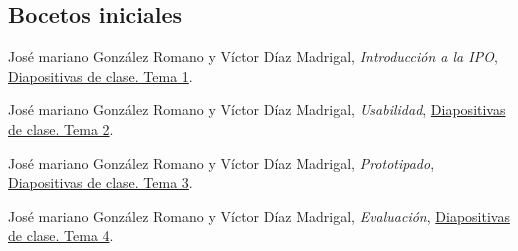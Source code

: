 \documentclass[a4paper,11pt]{article}
\begin{document}
\subsection{Bocetos iniciales}\label{bocetos}



\begin{thebibliography}{99}
  José mariano González Romano y Víctor Díaz Madrigal,
  \textit{Introducción a la IPO},
  \href{https://s3-eu-central-1.amazonaws.com/learn-eu-central-1-prod-fleet01-xythos/5ac734ed505df/1497177?response-content-disposition=inline%3B%20filename%2A%3DUTF-8%27%27IPO-2018-19-01-Introducci%25C3%25B3n%2520a%2520la%2520IPO.pdf&response-content-type=application%2Fpdf&X-Amz-Algorithm=AWS4-HMAC-SHA256&X-Amz-Date=20181009T201303Z&X-Amz-SignedHeaders=host&X-Amz-Expires=21600&X-Amz-Credential=AKIAIZ3QX2YUHH4EOO3A%2F20181009%2Feu-central-1%2Fs3%2Faws4_request&X-Amz-Signature=91e59768c9f86b77180953691bdcae19f7300073d4ad74d0949de1515d0b6f55}{Diapositivas de clase. Tema 1}.

    José mariano González Romano y Víctor Díaz Madrigal,
    \textit{Usabilidad},
    \href{https://s3-eu-central-1.amazonaws.com/learn-eu-central-1-prod-fleet01-xythos/5ac734ed505df/1548262?response-content-disposition=inline%3B%20filename%2A%3DUTF-8%27%27IPO-2018-19-02-Usabilidad.pdf&response-content-type=application%2Fpdf&X-Amz-Algorithm=AWS4-HMAC-SHA256&X-Amz-Date=20181108T092002Z&X-Amz-SignedHeaders=host&X-Amz-Expires=21600&X-Amz-Credential=AKIAIZ3QX2YUHH4EOO3A%2F20181108%2Feu-central-1%2Fs3%2Faws4_request&X-Amz-Signature=b6f88f86fcc8fc9e65cb7762b151621c9d17779d12ea366fa9e6cf74db65f16f}{Diapositivas de clase. Tema 2}.

  José mariano González Romano y Víctor Díaz Madrigal,
  \textit{Prototipado},
  \href{https://s3-eu-central-1.amazonaws.com/learn-eu-central-1-prod-fleet01-xythos/5ac734ed505df/1717656?response-content-disposition=inline%3B%20filename%2A%3DUTF-8%27%27IPO-2018-19-03-Prototipado.pdf&response-content-type=application%2Fpdf&X-Amz-Algorithm=AWS4-HMAC-SHA256&X-Amz-Date=20181108T092046Z&X-Amz-SignedHeaders=host&X-Amz-Expires=21600&X-Amz-Credential=AKIAIZ3QX2YUHH4EOO3A%2F20181108%2Feu-central-1%2Fs3%2Faws4_request&X-Amz-Signature=a298d276e4c75007b2970ddc1e4aa7fa8c92e35d85e8ed270504f153329534cb}{Diapositivas de clase. Tema 3}.

  José mariano González Romano y Víctor Díaz Madrigal,
  \textit{Evaluación},
  \href{https://s3-eu-central-1.amazonaws.com/learn-eu-central-1-prod-fleet01-xythos/5ac734ed505df/1868140?response-content-disposition=inline%3B%20filename%2A%3DUTF-8%27%27IPO-2018-19-04-Evaluaci%25C3%25B3n.pdf&response-content-type=application%2Fpdf&X-Amz-Algorithm=AWS4-HMAC-SHA256&X-Amz-Date=20181108T092127Z&X-Amz-SignedHeaders=host&X-Amz-Expires=21600&X-Amz-Credential=AKIAIZ3QX2YUHH4EOO3A%2F20181108%2Feu-central-1%2Fs3%2Faws4_request&X-Amz-Signature=df3ee954b039d2239e0947995469951f22d0bd91826341575b083d05e3865ccc}{Diapositivas de clase. Tema 4}.


\end{thebibliography}
\end{document}
